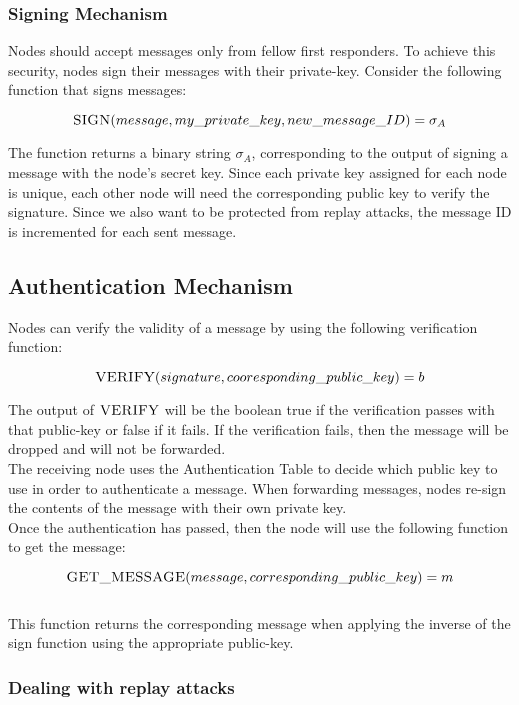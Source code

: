 \documentclass[letterpaper]{article}
\begin{document}
\subsubsection{Signing Mechanism}

Nodes should accept messages only from fellow first responders. 
To achieve this security, nodes sign their messages with their private-key. 
Consider the following function that signs messages:

$$\textsc{SIGN}(message, my\_private\_key, new\_message\_ID) = \sigma_{A}$$

The function returns a binary string $\sigma_{A}$, corresponding to the output of signing a message with the node's secret key. Since each private key assigned for each node is unique, each other node will need the corresponding public key to verify the signature. Since we also want to be protected from replay attacks, the message ID is incremented for each sent message.

\subsection{Authentication Mechanism}
Nodes can verify the validity of a message by using the following verification function:

$$\textsc{VERIFY}(signature, cooresponding\_public\_key) =  b $$

The output of $\textsc{VERIFY}$ will be the boolean true if the verification passes with that public-key or false if it fails. If the verification fails, then the message will be dropped and will not be forwarded. 
\\
The receiving node uses the Authentication Table to decide which public key to use in order to authenticate a message. When forwarding messages, nodes re-sign the contents of the message with their own private key.
\\

Once the authentication has passed, then the node will use the following function to get the message:

$$\textsc{GET\_MESSAGE}(message, corresponding\_public\_key) = m$$
\\

This function returns the corresponding message when applying the inverse of the sign function using the appropriate public-key.

\subsubsection{Dealing with replay attacks}
\end{document}
